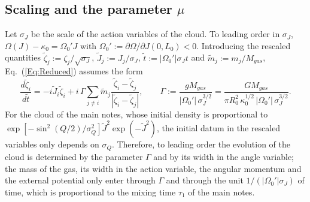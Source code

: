 \documentclass[prd,aps,nofootinbib,superscriptaddress,amsmath,amssymb]{revtex4}
\begin{document}
\subsection{Scaling and the parameter $\mu$}
\label{SubSec:Scaling}

Let $\sigma_J$ be the scale of the action variables of the cloud. To leading order in $\sigma_J$, $\Omega(J) - \kappa_0 = \Omega_0' J$ with $\Omega_0' := \partial\Omega/\partial J(0,L_0) < 0$. Introducing the rescaled quantities $\tilde{\zeta}_j := \zeta_j/\sqrt{\sigma_J}$, $\tilde{J}_j := J_j/\sigma_J$, $\tilde{t} := |\Omega_0'|\sigma_J t$ and $\tilde{m}_j := m_j/M_{gas}$, Eq.~(\ref{Eq:Reduced}) assumes the form
\begin{equation}
\frac{d\tilde{\zeta}_i}{d\tilde{t}} = -i\tilde{J}_i\tilde{\zeta}_i
 + i\,\Gamma\sum\limits_{j\neq i} \tilde{m}_j\frac{\tilde{\zeta}_i - \tilde{\zeta}_j}{|\tilde{\zeta}_i - \tilde{\zeta}_j|},\qquad
\Gamma := \frac{g M_{gas}}{|\Omega_0'|\,\sigma_J^{3/2}} = \frac{G M_{gas}}{\pi R_0^2\,\kappa_0^{1/2}\,|\Omega_0'|\,\sigma_J^{3/2}}.
\label{Eq:Gamma}
\end{equation}
For the cloud of the main notes, whose initial density is proportional to $\exp[-\sin^2(Q/2)/\sigma_Q^2]\tilde{J}^2\exp(-\tilde{J}^2)$, the initial datum in the rescaled variables only depends on $\sigma_Q$. Therefore, to leading order the evolution of the cloud is determined by the parameter $\Gamma$ and by its width in the angle variable; the mass of the gas, its width in the action variable, the angular momentum and the external potential only enter through $\Gamma$ and through the unit $1/(|\Omega_0'|\sigma_J)$ of time, which is proportional to the mixing time $\tau_1$ of the main notes.
\end{document}
